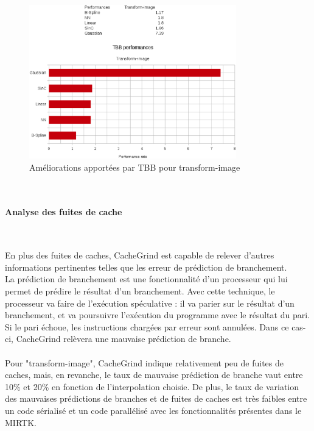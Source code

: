 \documentclass[10pt]{report}
\begin{document}
		\begin{figure}[h!]
			\begin{center}
				\includegraphics[width=9cm]{Reports/figures/performances_tbb_transform_image.eps}
			\end{center}	
			\caption{Améliorations apportées par TBB pour transform-image}
			\label{Améliorations apportées par TBB pour transform-image}
		\end{figure}~\par
%		
		\paragraph{Analyse des fuites de cache}~\par
		En plus des fuites de caches, CacheGrind est capable de relever d'autres informations pertinentes telles que les erreur de prédiction de branchement.\\
		La prédiction de branchement est une fonctionnalité d'un processeur qui lui permet de prédire le résultat d'un branchement. Avec cette technique, le processeur va faire de l’exécution spéculative : il va parier sur le résultat d'un branchement, et va poursuivre l’exécution du programme avec le résultat du pari. Si le pari échoue, les instructions chargées par erreur sont annulées. Dans ce cas-ci, CacheGrind relèvera une mauvaise prédiction de branche. \\
		\\Pour "transform-image", CacheGrind indique relativement peu de fuites de caches, mais, en revanche, le taux de mauvaise prédiction de branche vaut entre 10\% et 20\% en fonction de l'interpolation choisie. De plus, le taux de variation des mauvaises prédictions de branches et de fuites de caches est très faibles entre un code sérialisé et un code parallélisé avec les fonctionnalités présentes dans le MIRTK.
\end{document}
